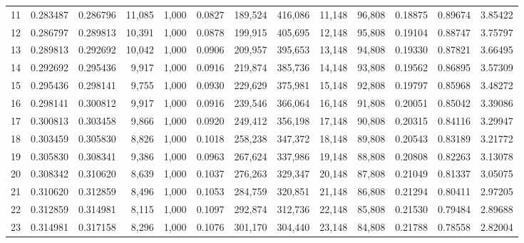 \begin{tabular}{rrrrrrrrrrrrr}
11  &  0.283487 &  0.286796 &  11,085 &  1,000 &                                     0.0827 &  189,524 &  416,086 &   11,148 &   96,808 &  0.18875 &  0.89674 &  3.85422 \\
12  &  0.286797 &  0.289813 &  10,391 &  1,000 &                                     0.0878 &  199,915 &  405,695 &   12,148 &   95,808 &  0.19104 &  0.88747 &  3.75797 \\
13  &  0.289813 &  0.292692 &  10,042 &  1,000 &                                     0.0906 &  209,957 &  395,653 &   13,148 &   94,808 &  0.19330 &  0.87821 &  3.66495 \\
14  &  0.292692 &  0.295436 &   9,917 &  1,000 &                                     0.0916 &  219,874 &  385,736 &   14,148 &   93,808 &  0.19562 &  0.86895 &  3.57309 \\
15  &  0.295436 &  0.298141 &   9,755 &  1,000 &                                     0.0930 &  229,629 &  375,981 &   15,148 &   92,808 &  0.19797 &  0.85968 &  3.48272 \\
16  &  0.298141 &  0.300812 &   9,917 &  1,000 &                                     0.0916 &  239,546 &  366,064 &   16,148 &   91,808 &  0.20051 &  0.85042 &  3.39086 \\
17  &  0.300813 &  0.303458 &   9,866 &  1,000 &                                     0.0920 &  249,412 &  356,198 &   17,148 &   90,808 &  0.20315 &  0.84116 &  3.29947 \\
18  &  0.303459 &  0.305830 &   8,826 &  1,000 &                                     0.1018 &  258,238 &  347,372 &   18,148 &   89,808 &  0.20543 &  0.83189 &  3.21772 \\
19  &  0.305830 &  0.308341 &   9,386 &  1,000 &                                     0.0963 &  267,624 &  337,986 &   19,148 &   88,808 &  0.20808 &  0.82263 &  3.13078 \\
20  &  0.308342 &  0.310620 &   8,639 &  1,000 &                                     0.1037 &  276,263 &  329,347 &   20,148 &   87,808 &  0.21049 &  0.81337 &  3.05075 \\
21  &  0.310620 &  0.312859 &   8,496 &  1,000 &                                     0.1053 &  284,759 &  320,851 &   21,148 &   86,808 &  0.21294 &  0.80411 &  2.97205 \\
22  &  0.312859 &  0.314981 &   8,115 &  1,000 &                                     0.1097 &  292,874 &  312,736 &   22,148 &   85,808 &  0.21530 &  0.79484 &  2.89688 \\
23  &  0.314981 &  0.317158 &   8,296 &  1,000 &                                     0.1076 &  301,170 &  304,440 &   23,148 &   84,808 &  0.21788 &  0.78558 &  2.82004 \\

\end{tabular}
